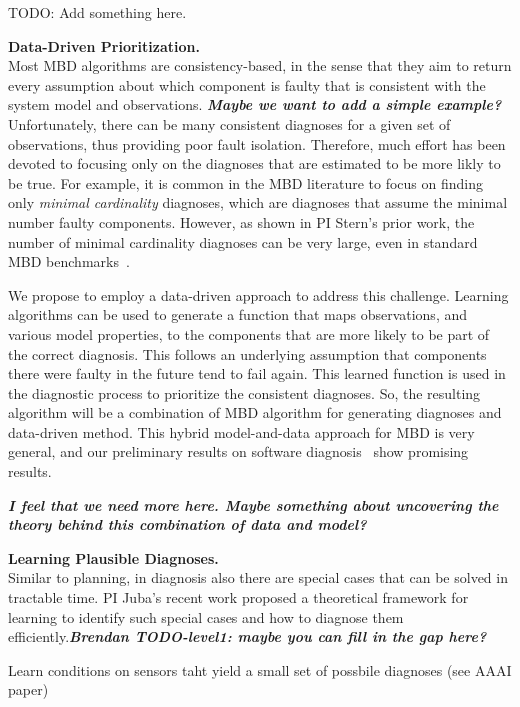 \documentclass[12pt]{article}
\newcommand{\note}[1]{\textbf{\textit{#1}}}
\begin{document}
TODO: Add something here.

{\bf Data-Driven Prioritization.}\\
Most MBD algorithms are consistency-based, in the sense that they aim to return every assumption about which component is faulty that is consistent with the system model and observations. \note{Maybe we want to add a simple example?} 
Unfortunately, there can be many consistent diagnoses for a given set of observations, thus providing poor fault isolation. Therefore, much effort has been devoted to focusing only on the diagnoses that are estimated to be more likly to be true. For example, it is common in the MBD literature to focus on finding only {\em minimal cardinality} diagnoses, which are diagnoses that assume the minimal number faulty components. However, as shown in PI Stern's prior work, the number of minimal cardinality diagnoses can be very large, even in standard MBD benchmarks~\cite{stern2015many}. 


We propose to employ a data-driven approach to address this challenge. 
Learning algorithms can be used to generate a function that maps observations, and various model properties, to the components that are more likely to be part of the correct diagnosis. This follows an underlying assumption that components there were faulty in the future tend to fail again. This learned function is used in the diagnostic process to prioritize the consistent diagnoses. So, the resulting algorithm will be a combination of MBD algorithm for generating diagnoses and data-driven method. This hybrid model-and-data approach for MBD is very general, and our preliminary results on software diagnosis~\cite{elmishali2016data} show promising results. 

\note{I feel that we need more here. Maybe something about uncovering the theory behind this combination of data and model?}


{\bf Learning Plausible Diagnoses.}\\
Similar to planning, in diagnosis also there are special cases that can be solved in tractable time. PI Juba's recent work proposed a theoretical framework for learning to identify such  special cases and how to diagnose them efficiently.\note{Brendan TODO-level1: maybe you can fill in the gap here?}



Learn conditions on sensors taht yield a small set of possbile diagnoses
(see AAAI paper)
\end{document}
